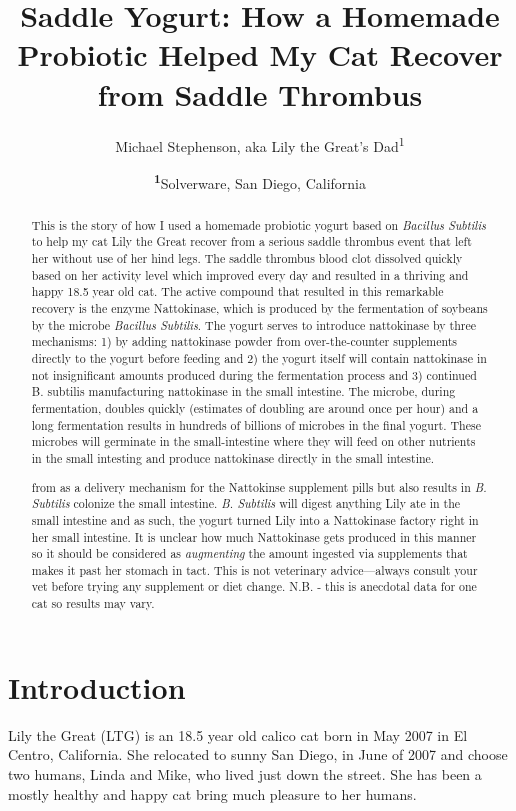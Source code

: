 \documentclass[twocolumn]{NobArticle}
\title{Saddle Yogurt: How a Homemade Probiotic Helped My Cat Recover from Saddle Thrombus}
\author{Michael Stephenson, aka Lily the Great's Dad\textsuperscript{1}}
\date{\textsuperscript{\textbf{1}}Solverware, San Diego, California}
\begin{document}
	
	\maketitle
	
	\begin{abstract}
		This is the story of how I used a homemade probiotic yogurt based on \textit{Bacillus Subtilis} to help my cat Lily the Great recover from a serious saddle thrombus event that left her without use of her hind legs. The saddle thrombus blood clot dissolved quickly based on her activity level which improved every day and resulted in a thriving and happy 18.5 year old cat. The active compound that resulted in this remarkable recovery is the enzyme Nattokinase, which is produced by the fermentation of soybeans by the microbe \textit{Bacillus Subtilis}. The yogurt serves to introduce nattokinase by three mechanisms: 1) by adding nattokinase powder from over-the-counter supplements directly to the yogurt before feeding and 2) the yogurt itself will contain nattokinase in not insignificant amounts produced during the fermentation process and 3) continued B. subtilis manufacturing nattokinase in the small intestine. The microbe, during fermentation, doubles quickly (estimates of doubling are around once per hour) and a long fermentation results in hundreds of billions of microbes in the final yogurt. These microbes will germinate in the small-intestine where they will feed on other nutrients in the small intesting and produce nattokinase directly in the small intestine. 
		
		
		from as a delivery mechanism for the Nattokinse supplement pills but also results in \textit{B. Subtilis} colonize the small intestine. \textit{B. Subtilis} will digest anything Lily ate in the small intestine and as such, the yogurt turned Lily into a Nattokinase factory right in her small intestine. It is unclear how much Nattokinase gets produced in this manner so it should be considered as \textit{augmenting} the amount ingested via supplements that makes it past her stomach in tact. This is not veterinary advice—always consult your vet before trying any supplement or diet change. N.B. - this is anecdotal data for one cat so results may vary.
	\end{abstract}
	
	\section{Introduction}
	Lily the Great (LTG) is an 18.5 year old calico cat born in May 2007 in El Centro, California. She relocated to sunny San Diego, in June of 2007 and choose two humans, Linda and Mike, who lived just down the street. She has been a mostly healthy and happy cat bring much pleasure to her humans.
	
\end{document}
